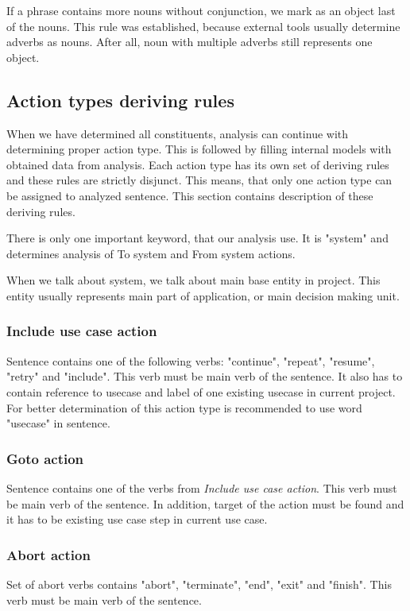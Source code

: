 If a phrase contains more nouns without conjunction, we mark as an object last of the nouns. This rule was established, because external tools usually determine adverbs as nouns. After all, noun with multiple adverbs still represents one object.

\subsection{Action types deriving rules}
\label{sec:actiontypes}
When we have determined all constituents, analysis can continue with determining proper action type. This is followed by filling internal models with obtained data from analysis. Each action type has its own set of deriving rules and these rules are strictly disjunct. This means, that only one action type can be assigned to analyzed sentence. This section contains description of these deriving rules. 

There is only one important keyword, that our analysis use. It is "system" and determines analysis of To system and From system actions. 

When we talk about system, we talk about main base entity in project. This entity usually represents main part of application, or main decision making unit.

\subsubsection{Include use case action}
Sentence contains one of the following verbs: "continue", "repeat", "resume", "retry" and "include".  This verb must be main verb of the sentence. It also has to contain reference to usecase and label of one existing usecase in current project. For better determination of this action type is recommended to use word "usecase" in sentence.

\subsubsection{Goto action}
Sentence contains one of the verbs from \emph{Include use case action}. This verb must be main verb of the sentence. In addition, target of the action must be found and it has to be existing use case step in current use case. 

\subsubsection{Abort action}
Set of abort verbs contains "abort", "terminate", "end", "exit" and "finish".  This verb must be main verb of the sentence.

